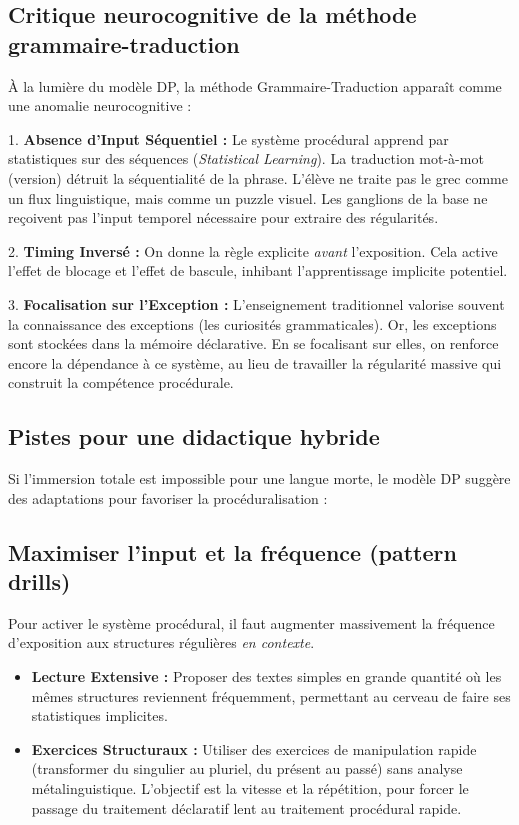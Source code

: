 \subsection{Critique neurocognitive de la méthode grammaire-traduction}

À la lumière du modèle DP, la méthode Grammaire-Traduction apparaît comme une anomalie
neurocognitive :

1. \textbf{Absence d'Input Séquentiel :} Le système procédural apprend par statistiques sur des
séquences (\textit{Statistical Learning}). La traduction mot-à-mot (\og version\fg{}) détruit la
séquentialité de la phrase. L'élève ne traite pas le grec comme un flux linguistique, mais comme un
puzzle visuel. Les ganglions de la base ne reçoivent pas l'input temporel nécessaire pour extraire
des régularités.

2. \textbf{Timing Inversé :} On donne la règle explicite \textit{avant} l'exposition. Cela active
l'effet de blocage et l'effet de bascule, inhibant l'apprentissage implicite potentiel.

3. \textbf{Focalisation sur l'Exception :} L'enseignement traditionnel valorise souvent la
connaissance des exceptions (\og les curiosités grammaticales\fg{}). Or, les exceptions sont
stockées dans la mémoire déclarative. En se focalisant sur elles, on renforce encore la dépendance à
ce système, au lieu de travailler la régularité massive qui construit la compétence procédurale.



\subsection{Pistes pour une didactique hybride}

Si l'immersion totale est impossible pour une langue morte, le modèle DP suggère des adaptations
pour favoriser la procéduralisation :



\subsection{Maximiser l'input et la fréquence (pattern drills)}

Pour activer le système procédural, il faut augmenter massivement la fréquence d'exposition aux
structures régulières \textit{en contexte}.

\begin{itemize}\item \textbf{Lecture Extensive :} Proposer des textes simples en grande quantité où les mêmes structures reviennent fréquemment, permettant au cerveau de faire ses statistiques implicites.\cite{II-2-1-ref5}\item \textbf{Exercices Structuraux :} Utiliser des exercices de manipulation rapide (transformer du singulier au pluriel, du présent au passé) sans analyse métalinguistique. L'objectif est la vitesse et la répétition, pour forcer le passage du traitement déclaratif lent au traitement procédural rapide.\end{itemize}

